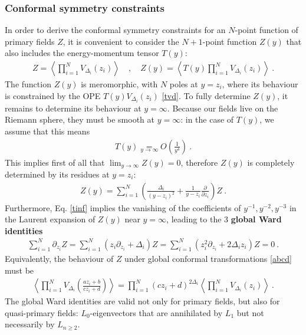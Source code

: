 \documentclass[12pt, a4paper]{article}
\newcommand{\myindex}[1]{\textbf{\boldmath #1}}
\begin{document}
\subsubsection{Conformal symmetry constraints}\label{sec:csc}

In order to derive the conformal symmetry constraints for an $N$-point function of primary fields $Z$, it is convenient to consider the $N+1$-point function $Z(y)$ that also includes the energy-momentum tensor $T(y)$:
\begin{align}
 Z = \left< \prod_{i=1}^N V_{\Delta_i}(z_i)\right> \quad , \quad Z(y) = \left< T(y)\prod_{i=1}^N V_{\Delta_i}(z_i)\right>\ .
\end{align}
The function $Z(y)$ is meromorphic, with $N$ poles at $y=z_i$, where its behaviour is constrained by the OPE $T(y)V_{\Delta_i}(z_i)$ \eqref{tvd}. To fully determine $Z(y)$, it remains to determine its behaviour at $y=\infty$. Because our fields live on the Riemann sphere, they must be smooth at $y=\infty$: in the case of $T(y)$, we assume that this means 
\begin{align}
 T(y) \underset{y\to\infty} = O\left(\frac{1}{y^4}\right)\ .
 \label{tinf}
\end{align}
This implies first of all that $\lim_{y\to \infty} Z(y)=0$, therefore $Z(y)$ is completely determined by its residues at $y=z_i$:
\begin{align}
 Z(y) = \sum_{i=1}^N \left(\frac{\Delta_i}{(y-z_i)^2} +\frac{1}{y-z_i}\frac{\partial}{\partial z_i}\right) Z\ .
 \label{zy}
\end{align}
Furthermore, Eq. \eqref{tinf} implies the vanishing of the coefficients of $y^{-1},y^{-2},y^{-3}$ in the Laurent expansion of $Z(y)$ near $y=\infty$, leading to the 3 \myindex{global Ward identities} 
\begin{align}
 \sum_{i=1}^N \partial_{z_i} Z = \sum_{i=1}^N \left(z_i \partial_{z_i} + \Delta_i\right) Z = \sum_{i=1}^N \left(z_i^2 \partial_{z_i} + 2\Delta_iz_i\right) Z = 0\ .
 \label{gward}
\end{align}
Equivalently, the behaviour of $Z$ under global conformal transformations \eqref{abcd} must be
\begin{align}
 \boxed{\left< \prod_{i=1}^N  V_{\Delta_i}\left(\frac{az_i+b}{cz_i+d}\right) \right>
 = \prod_{i=1}^N (cz_i +d)^{2\Delta_i} \left< \prod_{i=1}^N V_{\Delta_i}(z_i) \right>}\ .
 \label{zgc}
\end{align}
The global Ward identities are valid not only for primary fields, but also for quasi-primary fields: $L_0$-eigenvectors that are annihilated by $L_1$ but not necessarily by $L_{n\geq 2}$. 
\end{document}
